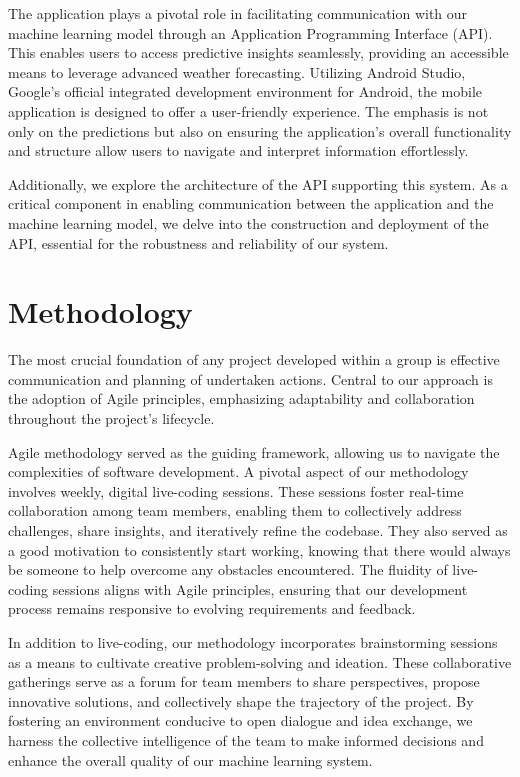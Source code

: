 The application plays a pivotal role in facilitating communication with our machine learning model through an Application Programming Interface (API). This enables users to access predictive insights seamlessly, providing an accessible means to leverage advanced weather forecasting. Utilizing Android Studio, Google's official integrated development environment for Android, the mobile application is designed to offer a user-friendly experience. The emphasis is not only on the predictions but also on ensuring the application's overall functionality and structure allow users to navigate and interpret information effortlessly.

Additionally, we explore the architecture of the API supporting this system. As a critical component in enabling communication between the application and the machine learning model, we delve into the construction and deployment of the API, essential for the robustness and reliability of our system.


\section{Methodology}
The most crucial foundation of any project developed within a group is effective communication and planning of undertaken actions. Central to our approach is the adoption of Agile principles, emphasizing adaptability and collaboration throughout the project's lifecycle.

Agile methodology served as the guiding framework, allowing us to navigate the complexities of software development. A pivotal aspect of our methodology involves weekly, digital live-coding sessions. These sessions foster real-time collaboration among team members, enabling them to collectively address challenges, share insights, and iteratively refine the codebase. They also served as a good motivation to consistently start working, knowing that there would always be someone to help overcome any obstacles encountered. The fluidity of live-coding sessions aligns with Agile principles, ensuring that our development process remains responsive to evolving requirements and feedback.

In addition to live-coding, our methodology incorporates brainstorming sessions as a means to cultivate creative problem-solving and ideation. These collaborative gatherings serve as a forum for team members to share perspectives, propose innovative solutions, and collectively shape the trajectory of the project. By fostering an environment conducive to open dialogue and idea exchange, we harness the collective intelligence of the team to make informed decisions and enhance the overall quality of our machine learning system.

